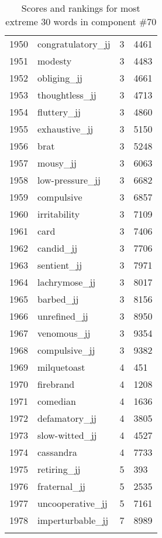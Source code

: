\begin{longtable}[!htbp]{| rlr@{.}l |}
    1950 & congratulatory\_jj & 3 & 4461 \\
    1951 & modesty & 3 & 4483 \\
    1952 & obliging\_jj & 3 & 4661 \\
    1953 & thoughtless\_jj & 3 & 4713 \\
    1954 & fluttery\_jj & 3 & 4860 \\
    1955 & exhaustive\_jj & 3 & 5150 \\
    1956 & brat & 3 & 5248 \\
    1957 & mousy\_jj & 3 & 6063 \\
    1958 & low-pressure\_jj & 3 & 6682 \\
    1959 & compulsive & 3 & 6857 \\
    1960 & irritability & 3 & 7109 \\
    1961 & card & 3 & 7406 \\
    1962 & candid\_jj & 3 & 7706 \\
    1963 & sentient\_jj & 3 & 7971 \\
    1964 & lachrymose\_jj & 3 & 8017 \\
    1965 & barbed\_jj & 3 & 8156 \\
    1966 & unrefined\_jj & 3 & 8950 \\
    1967 & venomous\_jj & 3 & 9354 \\
    1968 & compulsive\_jj & 3 & 9382 \\
    1969 & milquetoast & 4 & 451 \\
    1970 & firebrand & 4 & 1208 \\
    1971 & comedian & 4 & 1636 \\
    1972 & defamatory\_jj & 4 & 3805 \\
    1973 & slow-witted\_jj & 4 & 4527 \\
    1974 & cassandra & 4 & 7733 \\
    1975 & retiring\_jj & 5 & 393 \\
    1976 & fraternal\_jj & 5 & 2535 \\
    1977 & uncooperative\_jj & 5 & 7161 \\
    1978 & imperturbable\_jj & 7 & 8989 \\
    \hline
    \caption{Scores and rankings for most extreme 30 words in component \#70} \\
\end{longtable}
